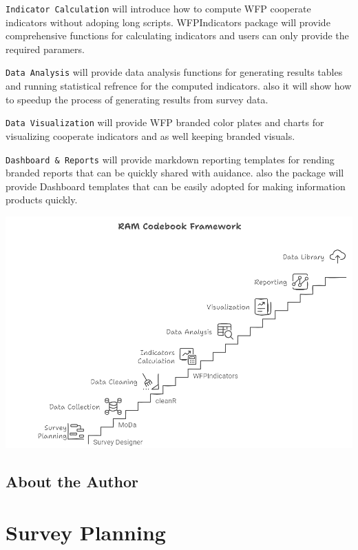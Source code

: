 \documentclass[
  letterpaper,
  DIV=11,
  numbers=noendperiod]{scrreprt}
\begin{document}
\texttt{Indicator\ Calculation} will introduce how to compute WFP
cooperate indicators without adoping long scripts. WFPIndicators package
will provide comprehensive functions for calculating indicators and
users can only provide the required paramers.

\texttt{Data\ Analysis} will provide data analysis functions for
generating results tables and running statistical refrence for the
computed indicators. also it will show how to speedup the process of
generating results from survey data.

\texttt{Data\ Visualization} will provide WFP branded color plates and
charts for visualizing cooperate indicators and as well keeping branded
visuals.

\texttt{Dashboard\ \&\ Reports} will provide markdown reporting
templates for rending branded reports that can be quickly shared with
auidance. also the package will provide Dashboard templates that can be
easily adopted for making information products quickly.

\includegraphics[width=1\textwidth,height=\textheight]{assets/Framework.png}

\hypertarget{about-the-author}{%
\section*{About the Author}\label{about-the-author}}



\hypertarget{survey-planning}{%
\chapter{Survey Planning}\label{survey-planning}}
\end{document}
